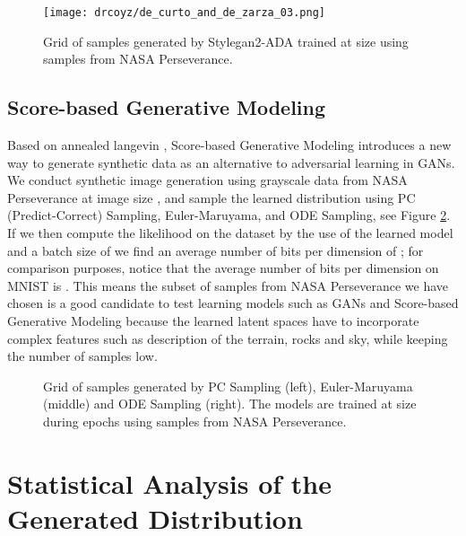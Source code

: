 \documentclass[lettersize,journal]{IEEEtran}
\begin{document}
\begin{figure}[ht]
\centering
\texttt{[image: drcoyz/de\_curto\_and\_de\_zarza\_03.png]}
\caption{Grid of  samples generated by Stylegan2-ADA trained at size  using samples from NASA Perseverance.}
\label{fge:03_decurto_and_dezarza}
\end{figure}

\subsection{Score-based Generative Modeling}
Based on annealed langevin \cite{Song2019,Song2020}, Score-based Generative Modeling introduces a new way to generate synthetic data as an alternative to adversarial learning in GANs.
\\

We conduct synthetic image generation using grayscale data from NASA Perseverance at image size , and sample the learned distribution using PC (Predict-Correct) Sampling, Euler-Maruyama, and ODE Sampling, see Figure \ref{fge:17_decurto_and_dezarza}.
\\

If we then compute the likelihood on the dataset by the use of the learned model and a batch size of  we find an average number of bits per dimension of ; for comparison purposes, notice that the average number of bits per dimension on MNIST is . This means the subset of samples from NASA Perseverance we have chosen is a good candidate to test learning models such as GANs and Score-based Generative Modeling because the learned latent spaces have to incorporate complex features such as description of the terrain, rocks and sky, while keeping the number of samples low. 

\begin{figure}[ht]
\centering
{}
\caption{Grid of  samples generated by PC Sampling (left), Euler-Maruyama (middle) and ODE Sampling (right). The models are trained at size  during  epochs using samples from NASA Perseverance.}
\label{fge:17_decurto_and_dezarza}
\end{figure}

\section{Statistical Analysis of the Generated Distribution}
\label{sn:statistical_analysis}
\end{document}
